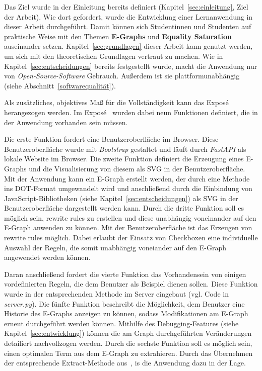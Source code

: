 Das Ziel wurde in der Einleitung bereits definiert (Kapitel~\ref{sec:einleitung}, Ziel der Arbeit).
Wie dort gefordert, wurde die Entwicklung einer Lernanwendung in dieser Arbeit durchgeführt. Damit können sich Studentinnen und Studenten auf praktische Weise mit den Themen 
\textbf{E-Graphs} und \textbf{Equality Saturation} auseinander setzen. Kapitel~\ref{sec:grundlagen} dieser Arbeit kann genutzt werden, um sich mit den
theoretischen Grundlagen vertraut zu machen. 
Wie in Kapitel~\ref{sec:entscheidungen} bereits festgestellt wurde, macht die Anwendung nur von \textit{Open-Source-Software} Gebrauch. Außerdem ist
sie plattformunabhängig (siehe Abschnitt~\ref{softwarequalität}).

Als zusätzliches, objektives Maß für die Vollständigkeit kann das Exposé herangezogen werden.
Im Exposé~\cite{expose} wurden dabei neun Funktionen definiert, die in der Anwendung vorhanden sein müssen.

Die erste Funktion fordert eine Benutzeroberfläche im Browser. Diese Benutzeroberfläche wurde mit \textit{Bootstrap} gestaltet und läuft durch \textit{FastAPI} als lokale Website 
im Browser. Die zweite Funktion definiert die Erzeugung eines E-Graphs und die Visualisierung von diesem als SVG in der Benutzeroberfläche. Mit der Anwendung kann ein E-Graph erstellt
werden, der durch eine Methode ins DOT-Format umgewandelt wird und anschließend durch die Einbindung von JavaScript-Bibliotheken (siehe Kapitel~\ref{sec:entscheidungen}) als SVG in der Benutzeroberfläche dargestellt werden kann.
Durch die dritte Funktion soll es möglich sein, rewrite rules zu erstellen und diese unabhängig voneinander auf den E-Graph anwenden zu können.  
Mit der Benutzeroberfläche ist das Erzeugen von rewrite rules möglich. Dabei erlaubt der Einsatz von Checkboxen eine individuelle Auswahl der Regeln, die somit unabhängig
voneiander auf den E-Graph angewendet werden können.

Daran anschließend fordert die vierte Funktion das Vorhandensein von einigen vordefinierten Regeln, die dem Benutzer als Beispiel dienen sollen.
Diese Funktion wurde in der entsprechenden Methode im Server eingebaut (vgl. Code in \textit{server.py}).
Die fünfte Funktion beschreibt die Möglichkeit, dem Benutzer eine Historie des E-Graphs anzeigen zu können, sodass Modifikationen am E-Graph erneut durchgeführt werden können.
Mithilfe des Debugging-Features (siehe Kapitel~\ref{sec:entwicklung}) können die am Graph durchgeführten Veränderungen detailiert nachvollzogen werden.
Durch die sechste Funktion soll es möglich sein, einen optimalen Term aus dem E-Graph zu extrahieren. Durch das Übernehmen der entsprechende Extract-Methode aus~\cite{devito}, 
is die Anwendung dazu in der Lage.

